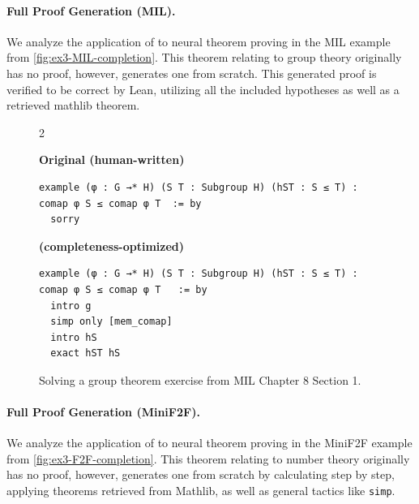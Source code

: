 \vspace{15px}
\paragraph{Full Proof Generation (MIL).}
\label{ex3}
We analyze the application of \methodname{} to neural theorem proving in the MIL example from \autoref{fig:ex3-MIL-completion}. This theorem relating to group theory originally has no proof, however, \methodname{} generates one from scratch. This generated proof is verified to be correct by Lean, utilizing all the included hypotheses as well as a retrieved mathlib theorem.




\setlength{\columnsep}{0.2cm}
\begin{figure}[ht]
\begin{multicols}{2}

{
\textbf{Original (human-written)}
\begin{scriptsize}
\begin{lstlisting}[basicstyle=\scriptsize\ttfamily]
example (φ : G →* H) (S T : Subgroup H) (hST : S ≤ T) : comap φ S ≤ comap φ T  := by
  sorry
\end{lstlisting}
\end{scriptsize}
}
\vfill\null
\columnbreak
{
\textbf{\methodname{} (completeness-optimized)}
\begin{scriptsize}
\begin{lstlisting}[basicstyle=\scriptsize\ttfamily]
example (φ : G →* H) (S T : Subgroup H) (hST : S ≤ T) : comap φ S ≤ comap φ T   := by
  intro g
  simp only [mem_comap]
  intro hS
  exact hST hS
\end{lstlisting}
\end{scriptsize}
}
\end{multicols}
\vspace{-2.5em}
\caption{Solving a group theorem exercise from MIL Chapter 8 Section 1.}
\vspace{-1em}
\label{fig:ex3-MIL-completion}
\end{figure}


\vspace{15px}
\paragraph{Full Proof Generation (MiniF2F).}

We analyze the application of \methodname{} to neural theorem proving in the MiniF2F example from \autoref{fig:ex3-F2F-completion}. This theorem relating to number theory originally has no proof, however, \methodname{} generates one from scratch by calculating step by step, applying theorems retrieved from Mathlib, as well as general tactics like \texttt{simp}.



